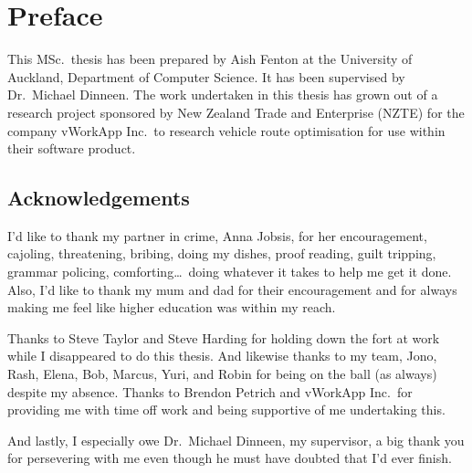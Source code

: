 
\chapter*{Preface}

This MSc.~thesis has been prepared by Aish Fenton at the University of Auckland, Department of Computer Science. It has been supervised by Dr.~Michael Dinneen. The work undertaken in this thesis has grown out of a research project sponsored by New Zealand Trade and Enterprise (NZTE) for the company vWorkApp Inc.~to research vehicle route optimisation for use within their software product.

\section*{Acknowledgements}

I'd like to thank my partner in crime, Anna Jobsis, for her encouragement, cajoling, threatening, bribing, doing my dishes, proof reading, guilt tripping, grammar policing, comforting\ldots\ doing whatever it takes to help me get it done. Also, I'd like to thank my mum and dad for their encouragement and for always making me feel like higher education was within my reach.

Thanks to Steve Taylor and Steve Harding for holding down the fort at work while I disappeared to do this thesis. And likewise thanks to my team, Jono, Rash, Elena, Bob, Marcus, Yuri, and Robin for being on the ball (as always) despite my absence. Thanks to Brendon Petrich and vWorkApp Inc.~for providing me with time off work and being supportive of me undertaking this. 

And lastly, I especially owe Dr.~Michael Dinneen, my supervisor, a big thank you for persevering with me even though he must have doubted that I'd ever finish.

\cleardoublepage

